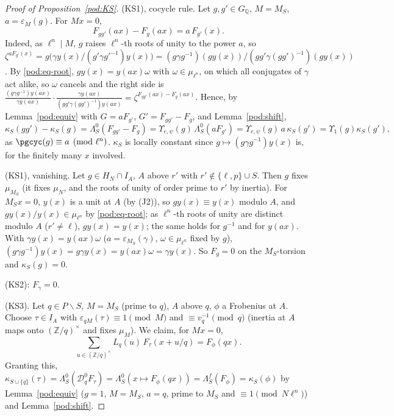 \documentclass[10pt]{amsart}
\theoremstyle{definition}
\theoremstyle{remark}
\newcommand{\Z}{\mathbb Z}
\newcommand{\Q}{\mathbb Q}
\begin{document}
\begin{proof}[Proof of Proposition~\ref{pod:KS}]
(KS1), cocycle rule. Let $g,g'\in G_\Q$, $M=M_S$, $a=\varepsilon_M(g)$. For $Mx=0$,
\[
F_{gg'}(ax)-F_g(ax)=a\,F_{g'}(x).
\]
Indeed, as $\ell^n\mid M$, $g$ raises $\ell^n$-th roots of unity to the power $a$, so
$\zeta^{aF_{g'}(x)}=g\bigl(\gamma y(x)/(g'\gamma g'^{-1})y(x)\bigr)=(g\gamma g^{-1})(gy(x))\big/
(gg'\gamma(gg')^{-1})(gy(x))$. By \eqref{pod:eq-root}, $gy(x)=y(ax)\omega$ with $\omega\in\mu_{\ell^n}$,
on which all conjugates of $\gamma$ act alike, so $\omega$ cancels and the right side is
$\frac{(g\gamma g^{-1})y(ax)}{\gamma y(ax)}\cdot\frac{\gamma y(ax)}{(gg'\gamma(gg')^{-1})y(ax)}=
\zeta^{F_{gg'}(ax)-F_g(ax)}$. Hence, by Lemma~\ref{pod:equiv} with $G=aF_{g'}$, $G'=F_{gg'}-F_g$, and
Lemma~\ref{pod:shift},
\[
\kappa_S(gg')-\kappa_S(g)=\Lambda_S^0(F_{gg'}-F_g)=\Upsilon_{e,\psi}(g)\,\Lambda_S^0(aF_{g'})=
\Upsilon_{e,\psi}(g)\,a\,\kappa_S(g')=\Upsilon_1(g)\kappa_S(g'),
\]
as $\pgcyc(g)\equiv a\pmod{\ell^n}$. $\kappa_S$ is locally constant since $g\mapsto(g\gamma g^{-1})y(x)$
is, for the finitely many $x$ involved.

(KS1), vanishing. Let $g\in H_N\cap I_A$, $A$ above $r'$ with $r'\notin\{\ell,p\}\cup S$. Then $g$
fixes $\mu_{M_S}$ (it fixes $\mu_N$, and the roots of unity of order prime to $r'$ by inertia).
For $M_Sx=0$, $y(x)$ is a unit at $A$ (by (J2)), so $gy(x)\equiv y(x)$ modulo $A$, and $gy(x)/y(x)
\in\mu_{\ell^n}$ by \eqref{pod:eq-root}; as $\ell^n$-th roots of unity are distinct modulo $A$
($r'\ne\ell$), $gy(x)=y(x)$; the same holds for $g^{-1}$ and for $y(ax)$. With $\gamma y(x)=
y(ax)\omega$ ($a=\varepsilon_{M_S}(\gamma)$, $\omega\in\mu_{\ell^n}$ fixed by $g$), $(g\gamma
g^{-1})y(x)=g\gamma y(x)=y(ax)\omega=\gamma y(x)$. So $F_g=0$ on the $M_S$-torsion and $\kappa_S(g)=0$.

(KS2): $F_\gamma=0$.

(KS3). Let $q\in P\smallsetminus S$, $M=M_S$ (prime to $q$), $A$ above $q$, $\phi$ a Frobenius at $A$.
Choose $\tau\in I_A$ with $\varepsilon_{qM}(\tau)\equiv1\pmod M$ and $\equiv v_q^{-1}\pmod q$ (inertia
at $A$ maps onto $(\Z/q)^\times$ and fixes $\mu_M$). We claim, for $Mx=0$,
\begin{equation}\label{pod:eq-FI}
\sum_{u\in(\Z/q)^\times}L_q(u)\,F_\tau(x+u/q)=F_\phi(qx).
\end{equation}
Granting this, $\kappa_{S\cup\{q\}}(\tau)=\Lambda_S^0(\mathcal D_q^0F_\tau)=\Lambda^0_S(x\mapsto
F_\phi(qx))=\Lambda_S^f(F_\phi)=\kappa_S(\phi)$ by Lemma~\ref{pod:equiv} ($g=1$, $M=M_S$, $a=q$, prime to $M_S$ and $\equiv1\pmod
{N\ell^n}$) and Lemma~\ref{pod:shift}.


\end{proof}
\end{document}
